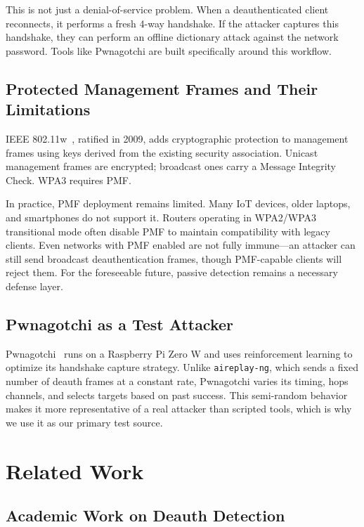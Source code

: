 \documentclass[conference]{IEEEtran}
\begin{document}
This is not just a denial-of-service problem. When a deauthenticated client reconnects, it performs a fresh 4-way handshake. If the attacker captures this handshake, they can perform an offline dictionary attack against the network password. Tools like Pwnagotchi are built specifically around this workflow.

\subsection{Protected Management Frames and Their Limitations}

IEEE 802.11w~\cite{ieee80211w}, ratified in 2009, adds cryptographic protection to management frames using keys derived from the existing security association. Unicast management frames are encrypted; broadcast ones carry a Message Integrity Check. WPA3 requires PMF.

In practice, PMF deployment remains limited. Many IoT devices, older laptops, and smartphones do not support it. Routers operating in WPA2/WPA3 transitional mode often disable PMF to maintain compatibility with legacy clients. Even networks with PMF enabled are not fully immune---an attacker can still send broadcast deauthentication frames, though PMF-capable clients will reject them. For the foreseeable future, passive detection remains a necessary defense layer.

\subsection{Pwnagotchi as a Test Attacker}

Pwnagotchi~\cite{pwnagotchi} runs on a Raspberry Pi Zero W and uses reinforcement learning to optimize its handshake capture strategy. Unlike \texttt{aireplay-ng}, which sends a fixed number of deauth frames at a constant rate, Pwnagotchi varies its timing, hops channels, and selects targets based on past success. This semi-random behavior makes it more representative of a real attacker than scripted tools, which is why we use it as our primary test source.

\section{Related Work}
\label{sec:related}

\subsection{Academic Work on Deauth Detection}
\end{document}
